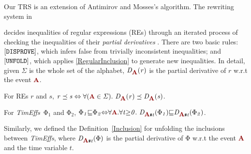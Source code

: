 \documentclass[acmsmall,10pt,review]{acmart}
\newcommand{\timedEffects}{\emph{TimEffs}}
\newcommand{\effect}{{\ensuremath{\mathrm{\Phi}}}}
\newcommand{\anyevent}[1]{{\textcolor{darkred}
{{\textbf{\small #1}}}}}
\newcommand{\code}[1]{{\tt{\ensuremath{\m{#1}}}}}
\newcommand{\codeme}[1]{{\tt{\ensuremath{#1}}}}
\newcommand{\CONTAIN}{\sqsubseteq}
\newcommand{\m}{\mathit}
\newcommand{\mysharp}{{\mathrel{\texttt{\#}}}}
\newcommand\tabref[1]{Table \textcolor{black}{\ref{#1}}.}
\newcommand\defref[1]{Definition~\textcolor{blue}{\ref{#1}}}
\begin{document}
Our TRS is 
an extension of Antimirov and Mosses's algorithm. The rewriting system in {\cite{DBLP:journals/tcs/AntimirovM95}  
decides inequalities of regular expressions (REs) through an iterated process of checking the inequalities of their 
\emph{partial derivatives} \cite{antimirov1995partial}. There are two basic rules: 
$\codeme{[DISPROVE]}$, which infers false from trivially inconsistent inequalities; and  
$\codeme{[UNFOLD]}$, which applies \autoref{RegularInclusion} to generate new inequalities.
In detail, given \code{\Sigma} is the whole set of the alphabet, 
\code{D_{\anyevent{A}}(r)} is the partial derivative of \code{r} w.r.t the event \code{\anyevent{A}}. 


\begin{definition}\label{RegularInclusion}  For REs \code{r} and \code{s}, \code{r \preceq s \Leftrightarrow \forall (\anyevent{A} \in \Sigma).\ D_{\anyevent{A}}(r) \preceq D_{\anyevent{A}}(s)}.
\end{definition}


\begin{definition}[\timedEffects\ Inclusion]\label{Inclusion}  %
For \timedEffects\ \code{\effect_1 } and \code{\effect_2}, 
\code{\effect_1 { \CONTAIN} \effect_2 {\Leftrightarrow} \forall \anyevent{A}. \forall t {\geq} 0.\ D_{\anyevent{A} \mysharp  t}(\effect_1)  
{\CONTAIN} D_{\anyevent{A} \mysharp  t}(\effect_2)}.
\end{definition}

Similarly, we defined the \defref{Inclusion} for unfolding the inclusions  
between \timedEffects, where \code{D_{\anyevent{A}\mysharp  t}(\effect)} 
is the partial derivative of \code{\effect} w.r.t the event 
\anyevent{A} and the time variable \code{t}. 









}
\end{document}
